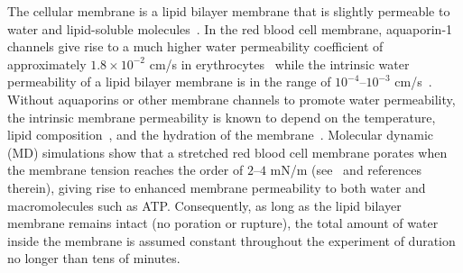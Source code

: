 \documentclass[prb,preprint,showpacs,preprintnumbers,amsmath,amssymb,longbibliography]{revtex4-1}
\begin{document}
The cellular membrane is a lipid bilayer membrane that is slightly permeable to water and lipid-soluble
molecules~\cite{Dick1964_JTB, FettiplaceHaydon1980_PhysRev,
DeamerBramhall1986_ChemPhysLipids, Grafmueller2019_ABLS}. 
%
%
In the red blood cell membrane, aquaporin-1 channels give rise to a much
higher water permeability coefficient of approximately $1.8\times 10^{-2}$ cm/s in
erythrocytes~\cite{YangMaVerkman2001_JBC} while the intrinsic water
permeability of a lipid bilayer membrane is in the range of
$10^{-4}$--$10^{-3}$ cm/s~\cite{ThompsonHuang1966_ANYAS,
FettiplaceHaydon1980_PhysRev, Grafmueller2019_ABLS, Dimova2020_GVB,
BhatiaRobinsonDimova2020_SoftMatt}. 
Without aquaporins or other membrane channels to promote water
permeability, the intrinsic membrane permeability is known to depend on the
temperature, lipid composition~\cite{OlbrichRawiczNeedhamEtAl2000_BJ},
and the hydration of the membrane~\cite{MarrinkBerendsen1994_JPhysChem}.
%
Molecular dynamic (MD) simulations show that a stretched red blood cell
membrane porates when the membrane tension reaches the order of $2$--$4$
mN/m (see~\citet{RazizadehNikfarPaulLiu2020_BJ} and references therein),
giving rise to enhanced membrane permeability to both water and
macromolecules such as ATP. Consequently, as long as the lipid bilayer membrane
remains intact (no poration or rupture), the total amount of water inside the membrane 
is assumed constant throughout the experiment of duration
no longer than tens of minutes.
%
\end{document}
